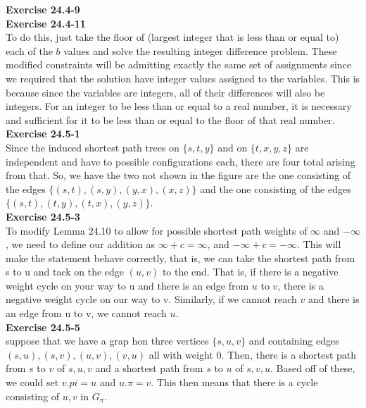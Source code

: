 \documentclass{article}
\begin{document}
\noindent\textbf{Exercise 24.4-9}\\



\noindent\textbf{Exercise 24.4-11}\\

To do this, just take the floor of (largest integer that is less than or equal to) each of the $b$ values and solve the resulting integer difference problem. These modified constraints will be admitting exactly the same set of assignments since we required that the solution have integer values assigned to the variables. This is because since the variables are integers, all of their differences will also be integers. For an integer to be less than or equal to a real number, it is necessary and sufficient for it to be less than or equal to the floor of that real number.\\



\noindent\textbf{Exercise 24.5-1}\\

Since the induced shortest path trees on $\{s,t,y\}$ and on $\{t,x,y,z\}$ are independent and have to possible configurations each, there are four total arising from that. So, we have the two not shown in the figure are the one consisting of the edges $\{(s,t),(s,y),(y,x),(x,z)\}$ and the one consisting of the edges $\{(s,t),(t,y),(t,x),(y,z)\}$.\\



\noindent\textbf{Exercise 24.5-3}\\

To modify Lemma 24.10 to allow for possible shortest path weights of $\infty$ and $-\infty$, we need to define our addition as $\infty + c = \infty$, and $-\infty + c = -\infty$. This will make the statement behave correctly, that is, we can take the shortest path from s to u and tack on the edge $(u,v)$ to the end. That is, if there is a negative weight cycle on your way to u and there is an edge from $u$ to $v$, there is a negative weight cycle on our way to v. Similarly, if we cannot reach $v$ and there is an edge from u to v, we cannot reach $u$.\\

\noindent\textbf{Exercise 24.5-5}\\
suppose that we have a grap hon three vertices $\{s,u,v\}$ and containing edges $(s,u),(s,v),(u,v),(v,u)$ all with weight 0. Then, there is a shortest path from $s$ to $v$ of $s,u,v$ and a shortest path from $s$ to $u$ of $s,v,u$. Based off of these, we could set $v.pi= u$ and $u.\pi = v$. This then means that there is a cycle consisting of $u,v$ in $G_\pi$.\\
\end{document}
